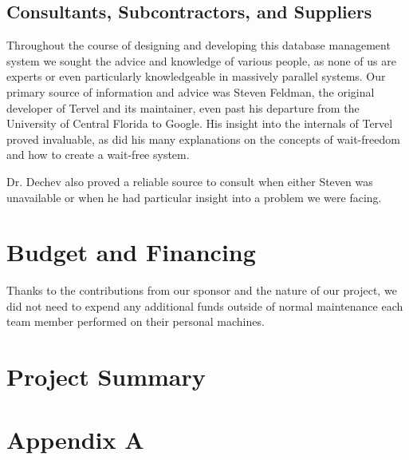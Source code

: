 \documentclass[letterpaper, 12pt]{article}
\begin{document}
\newpage

\subsection{Consultants, Subcontractors, and Suppliers}
Throughout the course of designing and developing this database management system we sought the advice
and knowledge of various people, as none of us are experts or even particularly knowledgeable in 
massively parallel systems. Our primary source of information and advice was Steven Feldman, the 
original developer of Tervel and its maintainer, even past his departure from the University of Central
Florida to Google. His insight into the internals of Tervel proved invaluable, as did his many 
explanations on the concepts of wait-freedom and how to create a wait-free system.
\par\vspace{\baselineskip}
Dr. Dechev also proved a reliable source to consult when either Steven was unavailable or when he
had particular insight into a problem we were facing. 
\newpage

\section{Budget and Financing}
Thanks to the contributions from our sponsor and the nature of our project, we did not need to expend
any additional funds outside of normal maintenance each team member performed on their personal
machines.
\newpage

\section{Project Summary}
\newpage



\newpage

\appendix
\section{Appendix A}
\end{document}
